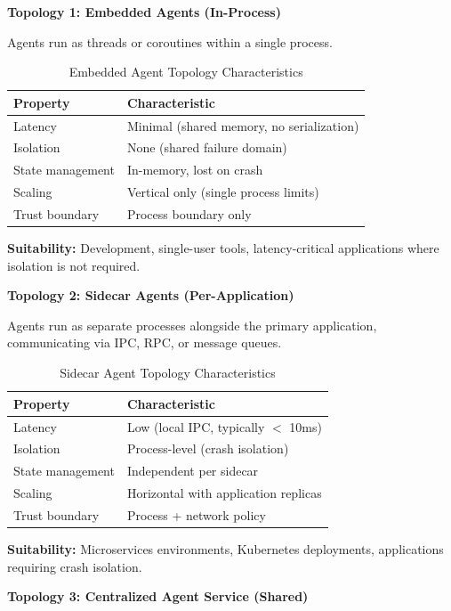 \textbf{Topology 1: Embedded Agents (In-Process)}

Agents run as threads or coroutines within a single process.

\begin{table}[htbp]
\centering
\caption{Embedded Agent Topology Characteristics}
\label{tab:embedded-topology}
\begin{tabular}{ll}
\toprule
\textbf{Property} & \textbf{Characteristic} \\
\midrule
Latency & Minimal (shared memory, no serialization) \\
Isolation & None (shared failure domain) \\
State management & In-memory, lost on crash \\
Scaling & Vertical only (single process limits) \\
Trust boundary & Process boundary only \\
\bottomrule
\end{tabular}
\end{table}

\textbf{Suitability:} Development, single-user tools, latency-critical applications where isolation is not required.

\textbf{Topology 2: Sidecar Agents (Per-Application)}

Agents run as separate processes alongside the primary application, communicating via IPC, RPC, or message queues.

\begin{table}[htbp]
\centering
\caption{Sidecar Agent Topology Characteristics}
\label{tab:sidecar-topology}
\begin{tabular}{ll}
\toprule
\textbf{Property} & \textbf{Characteristic} \\
\midrule
Latency & Low (local IPC, typically $<$ 10ms) \\
Isolation & Process-level (crash isolation) \\
State management & Independent per sidecar \\
Scaling & Horizontal with application replicas \\
Trust boundary & Process + network policy \\
\bottomrule
\end{tabular}
\end{table}

\textbf{Suitability:} Microservices environments, Kubernetes deployments, applications requiring crash isolation.

\textbf{Topology 3: Centralized Agent Service (Shared)}

